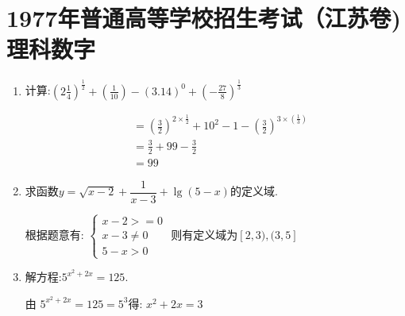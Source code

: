 \section[1977年高考数学试卷及答案(江苏卷)理科]{1977年普通高等学校招生考试（江苏卷)\\\Huge{理科数字}}

\begin{questions}
	\question
	\begin{enumerate}[label=(\arabic*)]
		\item 计算:$ \left(2\frac14\right)^\frac12 + \left(\frac{1}{10}\right) - (3.14)^0 +
			      \left(-\frac{27}{8}\right)^{\frac13} $
		      \begin{solution}
			      \begin{align*}
				       & = \left(\frac32\right)^{2\times\frac12} + 10^2 - 1 - \left(\frac32\right)^{3\times(\frac13)} \\
				       & = \frac32 + 99 - \frac32                                                                     \\
				       & = 99
			      \end{align*}
		      \end{solution}

		\item 求函数$y=\sqrt{x-2} + \dfrac{1}{x-3} + \lg(5-x)$的定义域.
		      \begin{solution}
			      根据题意有:
			      \begin{math}
				      \begin{cases}
					      x - 2 >= 0   \\
					      x - 3 \neq 0 \\
					      5 - x > 0
				      \end{cases}
			      \end{math}
			      则有定义域为$[2,3),(3,5]$

		      \end{solution}
		\item 解方程:$ 5^{x^2+2x} = 125 $.
		      \begin{solution}
			      由 $5^{x^2 + 2x} = 125 = 5^3 $得: $x^2 + 2x = 3$


\end{solution}
\end{enumerate}
\end{questions}
